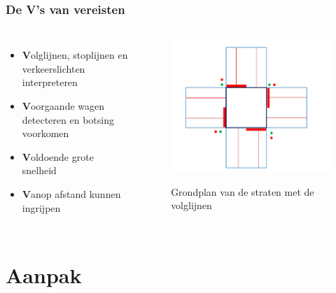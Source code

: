 \documentclass
   [kulak] %
   {kulakbeamer}
\begin{document}
\begin{frame}
\frametitle{De V's van vereisten}
\begin{columns}
	\begin{itemize}
		\item \textbf{V}olglijnen, stoplijnen en verkeerslichten interpreteren
		\item \textbf{V}oorgaande wagen detecteren en botsing voorkomen
		\item \textbf{V}oldoende grote snelheid
		\item \textbf{V}anop afstand kunnen ingrijpen
	\end{itemize}
	
		\begin{figure}
			\centering
			\includegraphics[width=.95\textwidth]{plattegrondStraten}
			\caption{Grondplan van de straten met de volglijnen}\cite{OpgavePO2}
		\end{figure}
	
\end{columns}

\end{frame}



\section{Aanpak}
\end{document}
